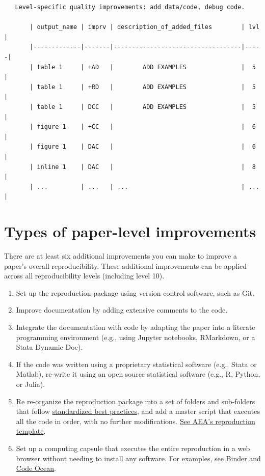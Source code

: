 \documentclass[]{book}
\providecommand{\tightlist}{%
  \setlength{\itemsep}{0pt}\setlength{\parskip}{0pt}}
\begin{document}
\begin{verbatim}
   Level-specific quality improvements: add data/code, debug code.

       | output_name | imprv | description_of_added_files        | lvl |
       |-------------|-------|-----------------------------------|-----|
       | table 1     | +AD   |        ADD EXAMPLES               |  5  |
       | table 1     | +RD   |        ADD EXAMPLES               |  5  |
       | table 1     | DCC   |        ADD EXAMPLES               |  5  |
       | figure 1    | +CC   |                                   |  6  |
       | figure 1    | DAC   |                                   |  6  |
       | inline 1    | DAC   |                                   |  8  |
       | ...         | ...   | ...                               | ... |  
\end{verbatim}

\hypertarget{paper-level}{%
\section{Types of paper-level improvements}\label{paper-level}}

There are at least six additional improvements you can make to improve a paper's overall reproducibility. These additional improvements can be applied across all reproducibility levels (including level 10).

\begin{enumerate}
\def\labelenumi{\arabic{enumi}.}
\tightlist
\item
  Set up the reproduction package using version control software, such as Git.
\item
  Improve documentation by adding extensive comments to the code.
\item
  Integrate the documentation with code by adapting the paper into a literate programming environment (e.g., using Jupyter notebooks, RMarkdown, or a Stata Dynamic Doc).
\item
  If the code was written using a proprietary statistical software (e.g., Stata or Matlab), re-write it using an open source statistical software (e.g., R, Python, or Julia).
\item
  Re re-organize the reproduction package into a set of folders and sub-folders that follow \href{https://www.projecttier.org/tier-protocol/specifications/\#overview-of-the-documentation}{standardized best practices}, and add a master script that executes all the code in order, with no further modifications. \href{https://github.com/AEADataEditor/replication-template}{See AEA's reproduction template}.\\
\item
  Set up a computing capsule that executes the entire reproduction in a web browser without needing to install any software. For examples, see \href{https://mybinder.org/}{Binder} and \href{https://codeocean.com/}{Code Ocean}.
\end{enumerate}
\end{document}
